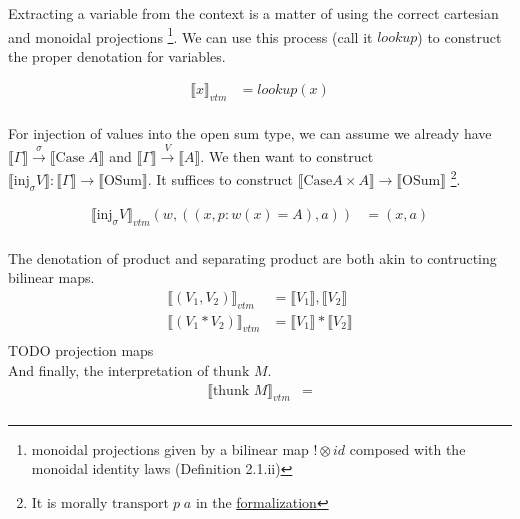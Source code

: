 \documentclass{article}
\newcommand{\den}[1]{\llbracket #1 \rrbracket}
\newcommand{\thunk}[1]{\textrm{thunk }#1}
\newcommand{\injj}[2]{\textrm{inj}_{#1}#2}
\begin{document}
Extracting a variable from the context is a matter of using the correct cartesian and monoidal projections
\footnote{monoidal projections given by a bilinear map $! \otimes id$ composed with the monoidal identity laws 
\cite{JACOBS199473}(Definition 2.1.ii)}. We can use this process (call it $lookup$) to construct the proper 
denotation for variables.

\begin{align*}
    \llbracket  x \rrbracket_{vtm} &= lookup(x) \\
\end{align*}

For injection of values into the open sum type, we can assume we already have 
$\den{\Gamma} \xrightarrow{\sigma} \den{\textrm{Case} \; A}$ and $\den{\Gamma} \xrightarrow{V} \den{A}$.
 We then want to construct $\den{\injj{\sigma}{V}} : \den{\Gamma} \rightarrow \den{\textrm{OSum}}$. 
It suffices to construct $\den{\textrm{Case} A \times A} \rightarrow \den{\textrm{OSum}}$
\footnote{It is morally $\textrm{transport} \; p \; a$ in the 
\href{https://github.com/bond15/Bunched-CBPV/blob/a2da10ec10f7bedcce8ded4aea6646b3a184d0b4/src/Models/FuturePast.agda#L264}
{formalization} }.

\begin{align*}
    \llbracket  \injj{\sigma}{V}\rrbracket_{vtm}(w, ((x , p : w(x)=A), a)) &= (x , a )\\
\end{align*}

The denotation of product and separating product are both akin to contructing bilinear maps.
\begin{align*}
    \llbracket  (V_1, V_2)\rrbracket_{vtm} &= \den{V_1} , \den{V_2}\\
    \llbracket  (V_1 * V_2)\rrbracket_{vtm} &= \den{V_1} * \den{V_2}\\
\end{align*}
TODO projection maps\\
And finally, the interpretation of $\thunk{M}$.
\begin{align*}
    \llbracket  \thunk{M}\rrbracket_{vtm} &= \\
\end{align*}
\end{document}
